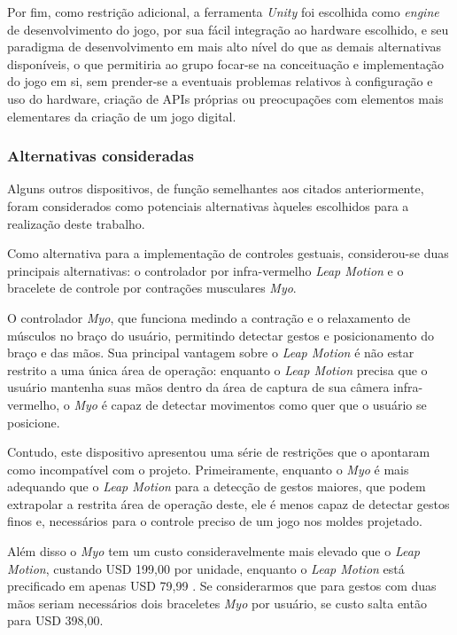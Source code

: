 Por fim, como restrição adicional, a ferramenta \textit{Unity} foi escolhida 
como \textit{engine} de desenvolvimento do jogo, por sua fácil integração 
ao hardware escolhido, e seu paradigma de desenvolvimento em mais alto nível do 
que as demais alternativas disponíveis, o que permitiria ao grupo focar-se 
na conceituação e implementação do jogo em si, sem prender-se a eventuais 
problemas relativos à configuração e uso do hardware, criação de APIs próprias 
ou preocupações com elementos mais elementares da criação de um jogo digital.

\subsubsection{Alternativas consideradas}

Alguns outros dispositivos, de função semelhantes aos 
citados anteriormente, foram considerados como potenciais 
alternativas àqueles escolhidos para a realização deste 
trabalho.

Como alternativa para a implementação de controles 
gestuais, considerou-se duas principais alternativas: 
o controlador por infra-vermelho \textit{Leap Motion} 
e o bracelete de controle por contrações musculares 
\textit{Myo}. 

O controlador \textit{Myo}, que funciona medindo a 
contração e o relaxamento de músculos no braço do 
usuário, permitindo detectar gestos e posicionamento 
do braço e das mãos. Sua principal vantagem sobre o 
\textit{Leap Motion} é não estar restrito a uma 
única área de operação: enquanto o \textit{Leap Motion} 
precisa que o usuário mantenha suas mãos dentro da 
área de captura de sua câmera infra-vermelho, o 
\textit{Myo} é capaz de detectar movimentos como 
quer que o usuário se posicione. 

Contudo, este dispositivo apresentou uma série de 
restrições que o apontaram como incompatível com o 
projeto. Primeiramente, enquanto o \textit{Myo} é 
mais adequando que o \textit{Leap Motion} para a 
detecção de gestos maiores, que podem extrapolar 
a restrita área de operação deste, ele é menos 
capaz de detectar gestos finos e, necessários para 
o controle preciso de um jogo nos moldes projetado. 

Além disso o \textit{Myo} tem um custo 
consideravelmente mais elevado que o \textit{Leap Motion}, 
custando USD 199,00 \cite{myo:2016:store} por unidade, 
enquanto o \textit{Leap Motion} está precificado em 
apenas USD 79,99  \cite{leap:2016:store}. Se 
considerarmos que para gestos com duas mãos seriam 
necessários dois braceletes \textit{Myo} por 
usuário, se custo salta então para USD 398,00.

